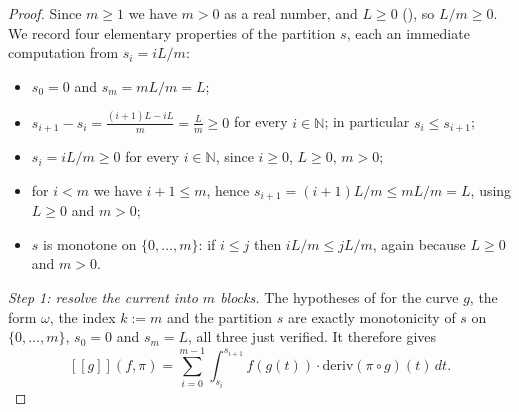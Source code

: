 \begin{proof}
  Since $m \ge 1$ we have $m > 0$ as a real number, and $L \ge 0$ (), so
  $L/m \ge 0$. We record four elementary properties of the partition $s$, each an immediate
  computation from $s_i = iL/m$:
  \begin{itemize}
    \item $s_0 = 0$ and $s_m = mL/m = L$;
    \item $s_{i+1} - s_i = \frac{(i+1)L - iL}{m} = \frac{L}{m} \ge 0$ for every $i \in \mathbb{N}$;
      in particular $s_i \le s_{i+1}$;
    \item $s_i = iL/m \ge 0$ for every $i \in \mathbb{N}$, since $i \ge 0$, $L \ge 0$, $m > 0$;
    \item for $i < m$ we have $i + 1 \le m$, hence $s_{i+1} = (i+1)L/m \le mL/m = L$, using
      $L \ge 0$ and $m > 0$;
    \item $s$ is monotone on $\{0,\dots,m\}$: if $i \le j$ then $iL/m \le jL/m$, again because
      $L \ge 0$ and $m > 0$.
  \end{itemize}

  \emph{Step 1: resolve the current into $m$ blocks.} The hypotheses of
   for the curve $g$, the form $\omega$, the index $k := m$ and
  the partition $s$ are exactly monotonicity of $s$ on $\{0,\dots,m\}$, $s_0 = 0$ and $s_m = L$,
  all three just verified. It therefore gives
  \begin{equation}\label{pcs-A}
    [[g]](f,\pi) = \sum_{i=0}^{m-1} \int_{s_i}^{s_{i+1}} f(g(t)) \cdot
      \mathrm{deriv}(\pi \circ g)(t)\,dt
    . \tag{A}
  \end{equation}


\end{proof}
